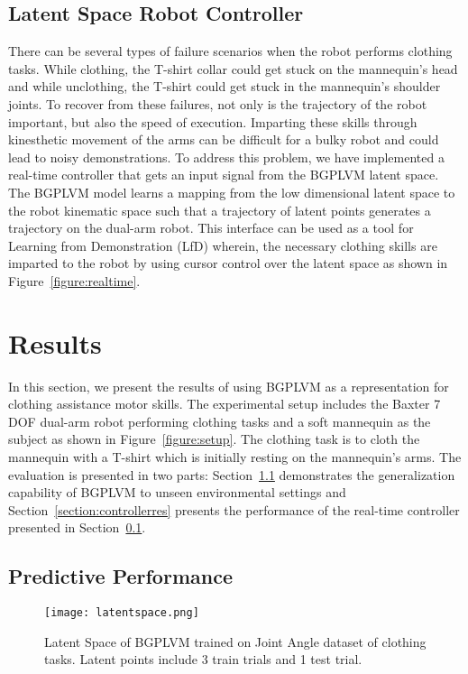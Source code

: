\documentclass[a4paper]{article}
\begin{document}
\subsection{Latent Space Robot Controller}
\label{section:controller}

There can be several types of failure scenarios when the robot performs clothing tasks. While clothing, the T-shirt collar could get stuck on the mannequin's head and while unclothing, the T-shirt could get stuck in the mannequin's shoulder joints. To recover from these failures, not only is the trajectory of the robot important, but also the speed of execution. Imparting these skills through kinesthetic movement of the arms can be difficult for a bulky robot and could lead to noisy demonstrations. To address this problem, we have implemented a real-time controller that gets an input signal from the BGPLVM latent space. The BGPLVM model learns a mapping from the low dimensional latent space to the robot kinematic space such that a trajectory of latent points generates a trajectory on the dual-arm robot. This interface can be used as a tool for Learning from Demonstration (LfD) wherein, the necessary clothing skills are imparted to the robot by using cursor control over the latent space as shown in Figure~\ref{figure:realtime}.

\section{Results}
\label{section:results}

In this section, we present the results of using BGPLVM as a representation for clothing assistance motor skills. The experimental setup includes the Baxter 7 DOF dual-arm robot performing clothing tasks and a soft mannequin as the subject as shown in Figure~\ref{figure:setup}. The clothing task is to cloth the mannequin with a T-shirt which is initially resting on the mannequin's arms. The evaluation is presented in two parts: Section~\ref{section:performance} demonstrates the generalization capability of BGPLVM to unseen environmental settings and Section~\ref{section:controllerres} presents the performance of the real-time controller presented in Section~\ref{section:controller}.

\subsection{Predictive Performance}
\label{section:performance}

\begin{figure}[t]
  \centering
  \texttt{[image: latentspace.png]}
  \caption{Latent Space of BGPLVM trained on Joint Angle dataset of clothing tasks. Latent points include 3 train trials and 1 test trial.}
  \label{figure:latent}
\end{figure}
\end{document}
